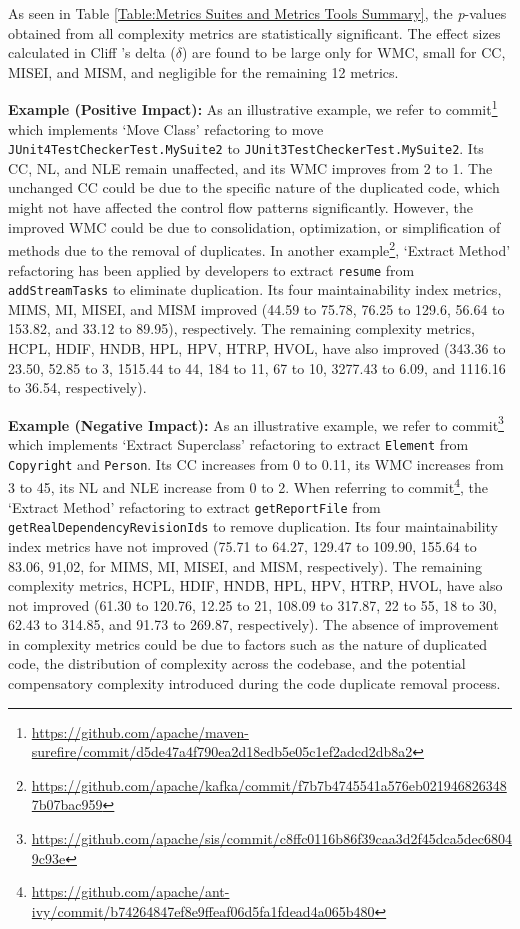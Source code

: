 As seen in Table \ref{Table:Metrics Suites and Metrics Tools Summary}, the \textit{p}-values obtained from all complexity metrics are statistically significant. The effect sizes
calculated in Cliff 's delta ($\delta$) are found to be large only for WMC, small for CC, MISEI, and MISM, and negligible for the remaining 12 metrics.

\noindent\textbf{Example (Positive Impact):} As an illustrative example, we refer to commit\footnote{\textcolor{black}{\url{https://github.com/apache/maven-surefire/commit/d5de47a4f790ea2d18edb5e05c1ef2adcd2db8a2}}} which implements `Move Class' refactoring to move \texttt{JUnit4TestChecker\break Test.MySuite2} to \texttt{JUnit3TestCheckerTest.MySuite2}. Its CC, NL, and NLE remain unaffected, and its WMC improves from 2 to 1. The unchanged CC could be due to the specific nature of the duplicated code, which might not have affected the control flow patterns significantly. However, the improved WMC could be due to consolidation, optimization, or simplification of methods due to the removal of duplicates. In another example\footnote{\textcolor{black}{\url{https://github.com/apache/kafka/commit/f7b7b4745541a576eb0219468263487b07bac959}}}, `Extract Method' refactoring has been applied by developers to extract \texttt{resume} from \texttt{addStreamTasks} to eliminate duplication. Its four maintainability index metrics, \ie MIMS, MI, MISEI, and MISM improved (44.59 to 75.78, 76.25 to 129.6, 56.64 to 153.82, and 33.12 to 89.95), respectively. The remaining complexity metrics, \ie HCPL, HDIF, HNDB, HPL, HPV, HTRP, HVOL, have also improved (343.36 to 23.50, 52.85 to 3, 1515.44 to 44, 184 to 11, 67 to 10, 3277.43 to 6.09, and 1116.16 to 36.54, respectively).

\noindent\textbf{Example (Negative Impact):} As an illustrative example, we refer to commit\footnote{\textcolor{black}{\url{https://github.com/apache/sis/commit/c8ffc0116b86f39caa3d2f45dca5dec68049c93e}}} which implements `Extract Superclass' refactoring to extract \texttt{Element} from \texttt{Copyright} and \texttt{Person}. Its CC increases from 0 to 0.11, its WMC increases from 3 to 45, its NL and NLE increase from 0 to 2. When referring to commit\footnote{\textcolor{black}{\url{https://github.com/apache/ant-ivy/commit/b74264847ef8e9ffeaf06d5fa1fdead4a065b480}}}, the `Extract Method' refactoring to extract \texttt{getReportFile} from \texttt{getRealDependencyRevisionIds} to remove duplication. Its four maintainability index metrics have not improved (75.71 to 64.27, 129.47 to 109.90, 155.64 to 83.06, 91,02, for MIMS, MI, MISEI, and MISM, respectively).   The remaining complexity metrics, \ie HCPL, HDIF, HNDB, HPL, HPV, HTRP, HVOL, have also not improved (61.30 to 120.76, 12.25 to 21, 108.09 to 317.87, 22 to 55, 18 to 30, 62.43 to 314.85, and 91.73 to 269.87, respectively). The absence of improvement in complexity metrics could be due to factors such as the nature of duplicated code, the distribution of complexity across the codebase, and the potential compensatory complexity introduced during the code duplicate removal process. 


